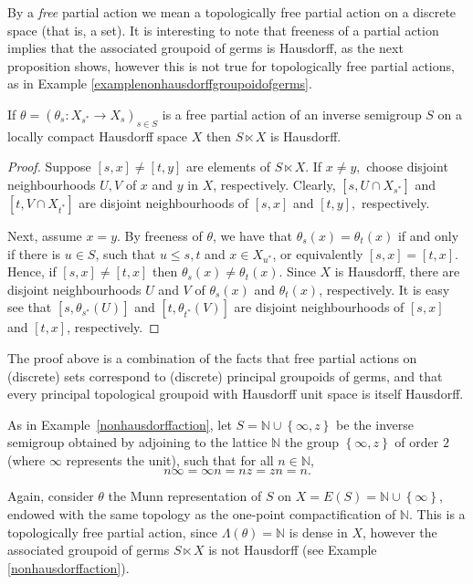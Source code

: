 By a \emph{free} partial action we mean a topologically free partial action on a discrete space (that is, a set). It is interesting to note that freeness of a partial action implies that the associated groupoid of germs is Hausdorff, as the next proposition shows, however this is not true for topologically free partial actions, as in Example \ref{examplenonhausdorffgroupoidofgerms}.

\begin{proposition}
If $\theta=\left(\theta_s:X_{s^*}\to X_s\right)_{s\in S}$ is a free partial action of an inverse semigroup $S$ on a locally compact Hausdorff space $X$ then $S\ltimes X$ is Hausdorff.
\end{proposition}
\begin{proof}
Suppose $[s,x]\neq [t,y]$ are elements of $S\ltimes X$. If $x \neq y,$ choose disjoint neighbourhoods $U, V$ of $x$ and $y$ in $X$, respectively. Clearly, $[s,U \cap X_{s^*}]$ and $[t,V \cap X_{t^*}]$ are disjoint neighbourhoods of $[s, x]$ and $[t,y],$ respectively.

Next, assume $x=y$. By freeness of $\theta$, we have that $\theta_s(x)=\theta_t(x)$ if and only if there is $u \in S$, such that $u\leq s,t$ and $x \in X_{u^*}$, or equivalently $[s,x]=[t,x]$. Hence, if $[s,x]\neq[t,x]$ then $\theta_s(x)\neq\theta_t(x)$. Since $X$ is Hausdorff, there are disjoint  neighbourhoods $U$ and $V$ of $\theta_s(x)$ and $\theta_t(x)$, respectively. It is easy see that $[s,\theta_{s^*}(U)]$ and $[t,\theta_{t^*}(V)]$ are disjoint neighbourhoods of $[s,x]$ and $[t,x]$, respectively.
\end{proof}

\begin{remark}
The proof above is a combination of the facts that free partial actions on (discrete) sets correspond to (discrete) principal  groupoids of germs, and that every principal topological groupoid with Hausdorff unit space is itself Hausdorff.
\end{remark}

\begin{example}\label{examplenonhausdorffgroupoidofgerms}
As in Example~\ref{nonhausdorffaction}, let $S=\mathbb{N}\cup\left\{\infty,z\right\}$ be the inverse semigroup obtained by adjoining to the lattice $\mathbb{N}$ the group $\left\{\infty,z\right\}$ of order $2$ (where $\infty$ represents the unit), such that for all $n\in\mathbb{N}$,
\[n\infty=\infty n=nz=zn=n.\]

Again, consider $\theta$ the Munn representation of $S$ on $X=E(S)=\mathbb{N}\cup\left\{\infty\right\}$, endowed with the same topology as the one-point compactification of $\mathbb{N}$. This is a topologically free partial action, since $\Lambda(\theta)=\mathbb{N}$ is dense in $X$, however the associated groupoid of germs $S\ltimes X$ is not Hausdorff (see Example \ref{nonhausdorffaction}).
\end{example}

